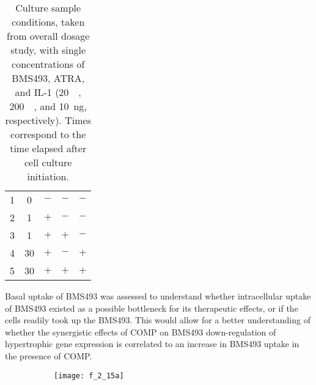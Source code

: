 \begin{refsection}
\begin{table}[h!]
\begin{tabular}{ ccccc }
  1 & 0 & ${-}$ & ${-}$ & ${-}$ \\
  2 & 1 & ${+}$ & ${-}$ & ${-}$ \\
  3 & 1 & ${+}$ & ${+}$ & ${-}$ \\
  4 & 30 & ${+}$ & ${-}$ & ${+}$ \\
  5 & 30 & ${+}$ & ${+}$ & ${+}$ \\

  \hline
\end{tabular}
\caption[Culture sample conditions]{Culture sample conditions, taken from
overall dosage study, with single concentrations of BMS493, ATRA, and IL-1
(\SI{20}{\micro\moLar}, \SI{200}{\nano\moLar}, and \SI{10}{\ng},
respectively). Times correspond to the time elapsed after cell culture
initiation.}
\label{tab:culture_extracts_table}
\end{table}
Basal uptake of BMS493 was assessed to understand whether
intracellular uptake of BMS493 existed as a possible bottleneck for its
therapeutic effects, or if the cells readily took up the BMS493. This would
allow for a better understanding of whether the synergistic effects of COMP on
BMS493 down-regulation of hypertrophic gene expression is correlated to an
increase in BMS493 uptake in the presence of COMP.
\begin{figure}[h!]
    \centering
    \begin{subfigure}[b]{0.8\textwidth}
        \texttt{[image: f\_2\_15a]}
        \caption{}
        \label{fig:culture_extracts_chrom}
    \end{subfigure}


\end{figure}
\end{refsection}
